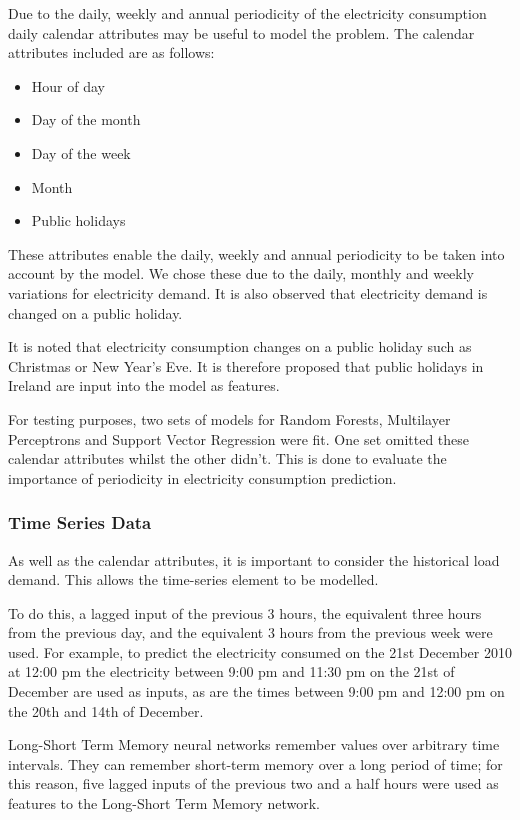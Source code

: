 Due to the daily, weekly and annual periodicity of the electricity consumption daily calendar attributes may be useful to model the problem. The calendar attributes included are as follows:

\begin{itemize}
	\item Hour of day
	\item Day of the month
	\item Day of the week
	\item Month
	\item Public holidays
\end{itemize}

These attributes enable the daily, weekly and annual periodicity to be taken into account by the model. We chose these due to the daily, monthly and weekly variations for electricity demand. It is also observed that electricity demand is changed on a public holiday.

It is noted that electricity consumption changes on a public holiday such as Christmas or New Year's Eve. It is therefore proposed that public holidays in Ireland are input into the model as features. 

For testing purposes, two sets of models for Random Forests, Multilayer Perceptrons and Support Vector Regression were fit. One set omitted these calendar attributes whilst the other didn't. This is done to evaluate the importance of periodicity in electricity consumption prediction.

\subsubsection{Time Series Data}

As well as the calendar attributes, it is important to consider the historical load demand. This allows the time-series element to be modelled.  

To do this, a lagged input of the previous 3 hours, the equivalent three hours from the previous day, and the equivalent 3 hours from the previous week were used. For example, to predict the electricity consumed on the 21st December 2010 at 12:00 pm the electricity between 9:00 pm and 11:30 pm on the 21st of December are used as inputs, as are the times between 9:00 pm and 12:00 pm on the 20th and 14th of December.

Long-Short Term Memory neural networks remember values over arbitrary time intervals. They can remember short-term memory over a long period of time; for this reason, five lagged inputs of the previous two and a half hours were used as features to the Long-Short Term Memory network.

